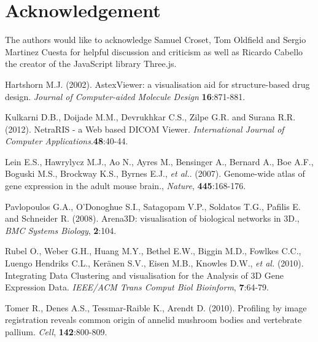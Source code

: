 \documentclass{bioinfo}
\begin{document}
\section*{Acknowledgement}
The authors would like to acknowledge Samuel Croset, Tom Oldfield and Sergio Martinez Cuesta for helpful discussion and criticism as well as Ricardo Cabello the creator of the JavaScript library Three.js.

%
%
%
%
%

%

%

\begin{thebibliography}{}

 Hartshorn M.J. (2002). AstexViewer: a visualisation aid for structure-based drug design. {\it{Journal of Computer-aided Molecule Design}} {\bf{16}}:871-881.

 Kulkarni D.B., Doijade M.M., Devrukhkar C.S., Zilpe G.R. and Surana R.R. (2012). NetraRIS - a Web based DICOM Viewer. {\it{International Journal of Computer Applications}}.{\bf{48}}:40-44.

 Lein E.S., Hawrylycz M.J., Ao N., Ayres M., Bensinger A., Bernard A., Boe A.F., Boguski M.S., Brockway K.S., Byrnes E.J., {\it{et al.}}. (2007). Genome-wide atlas of gene expression in the adult mouse brain., {\it Nature}, {\bf{445}}:168-176.

 Pavlopoulos G.A., O'Donoghue S.I., Satagopam V.P., Soldatos T.G., Pafilis E. and Schneider R. (2008). Arena3D: visualisation of biological networks in 3D., {\it BMC Systems Biology}, {\bf{2}}:104.

 Rubel O., Weber G.H., Huang M.Y., Bethel E.W., Biggin M.D., Fowlkes C.C., Luengo Hendriks C.L., Ker\"{a}nen S.V., Eisen M.B., Knowles D.W., {\it{et al.}} (2010). Integrating Data Clustering and visualisation for the Analysis of 3D Gene Expression Data. {\it IEEE/ACM Trans Comput Biol Bioinform}, {\bf{7}}:64-79.

 Tomer R., Denes A.S., Tessmar-Raible K., Arendt D. (2010). Profiling by image registration reveals common origin of annelid mushroom bodies and vertebrate pallium. {\it{Cell}}, {\bf{142}}:800-809. 


\end{thebibliography}
\end{document}
